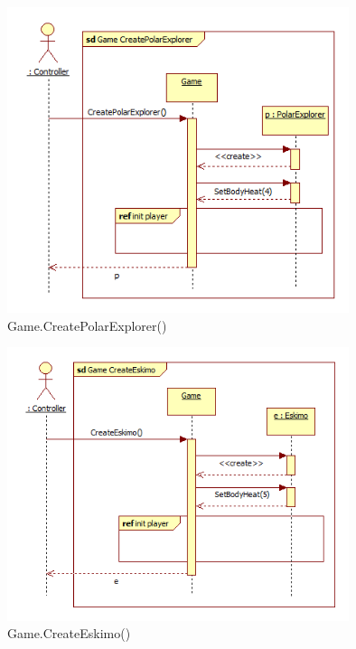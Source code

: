 \begin{figure}[H]
	\begin{center}
		\includegraphics[width=10cm]{chapters/chapter04/seqdiag/Game_CreatePolarExplorer.png}
		\caption{Game.CreatePolarExplorer()}
		\label{fig:GameCreatePolarExplorer}
	\end{center}
\end{figure}
\begin{figure}[H]
	\begin{center}
		\includegraphics[width=10cm]{chapters/chapter04/seqdiag/Game_CreateEskimo.png}
		\caption{Game.CreateEskimo()}
		\label{fig:GameCreateEskimo}
	\end{center}
\end{figure}
